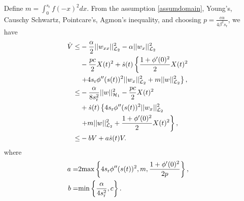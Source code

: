 \documentclass[journal]{IEEEtran}
\begin{document}
Define $m =\int_0^{s_{{\mathrm r}}} f(-x)^2 dx$. From the  assumption \eqref{assumdomain}, Young's, Causchy Schwartz, Pointcare's, Agmon's inequality, and choosing $p = \frac{c \alpha}{4 \beta^2 s_{{\mathrm r}}}$, we have
\begin{align}
\dot{V} \leq& - \frac{\alpha}{2}||w_{xx}||_{{\cal L}_2}^2 -\alpha || w_{x}||_{{\cal L}_2}^2 \notag\\
&-\frac{pc}{2}X(t)^2 +\dot{s}(t) \left\{ \frac{1+ \phi'(0)^2}{2} X(t)^2 \right.\notag\\
&\left. + 4 s_{{\mathrm r}} \phi''(s(t))^2 || w_{x}||_{{\cal L}_2}^2 + m || w||_{{\cal L}_2}^2 \right\},\notag\\
 \leq & - \frac{\alpha}{8s_{{\mathrm r}}^2} || w||_{{\cal H}_1}^2 -\frac{pc}{2}X(t)^2  \notag\\
 & +\dot{s}(t) \left\{4 s_{{\mathrm r}} \phi''(s(t))^2  ||w_{x}||_{{\cal L}_2}^2 \right.\notag\\
 &\left. + m || w||_{{\cal L}_2}^2 +  \frac{1+ \phi'(0)^2}{2} X(t)^2 \right\},\notag\\
 \leq & - bV + a \dot{s}(t)V.
\end{align}
where 
\begin{align}
a =& 2 {\rm max} \left\{ 4 s_{{\mathrm r}} \phi''(s(t))^2, m, \frac{1+ \phi'(0)^2}{2p}\right\},\\
b =& {\rm min} \left\{\frac{\alpha}{4s_{{\mathrm r}}^2}, c\right\}.
\end{align}
\end{document}
